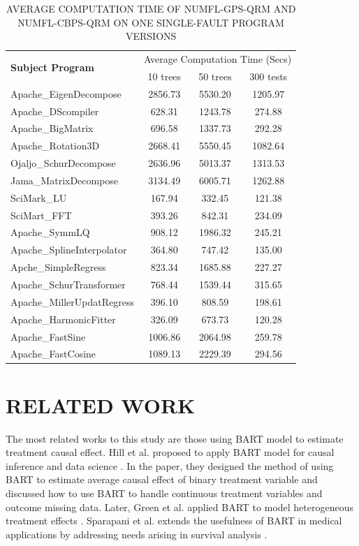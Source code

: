 \begin{table}[htbp!]
\caption{AVERAGE COMPUTATION TIME OF NUMFL-GPS-QRM AND NUMFL-CBPS-QRM ON ONE SINGLE-FAULT PROGRAM VERSIONS }
\label{BARTcomputetime}
\centering
      \begin{tabular}{|l|c|c|c|}
      \hline
\multirow{2}{*}{{\bf Subject Program}}	&	\multicolumn{3}{|c|}{Average Computation Time (Secs)}	\\	\cline{2-4}
& 10 trees & 50 trees & 300 tests\\ \hline

Apache\_EigenDecompose	&	2856.73	&	5530.20	&	1205.97	\\ \hline
Apache\_DScompiler	&	628.31	&	1243.78	&	274.88	\\ \hline
Apache\_BigMatrix	&	696.58	&	1337.73	&	292.28	\\ \hline
Apache\_Rotation3D	&	2668.41	&	5550.45	&	1082.64	\\ \hline
Ojaljo\_SchurDecompose	&	2636.96	&	5013.37	&	1313.53	\\ \hline
Jama\_MatrixDecompose	&	3134.49	&	6005.71	&	1262.88	\\ \hline
SciMark\_LU	&	167.94	&	332.45	&	121.38	\\ \hline
SciMart\_FFT	&	393.26	&	842.31	&	234.09	\\ \hline
Apache\_SymmLQ	&	908.12	&	1986.32	&	245.21	\\ \hline
Apache\_SplineInterpolator	&	364.80	&	747.42	&	135.00	\\ \hline
Apche\_SimpleRegress	&	823.34	&	1685.88	&	227.27	\\ \hline
Apache\_SchurTransformer	&	768.44	&	1539.44	&	315.65	\\ \hline
Apache\_MillerUpdatRegress	&	396.10	&	808.59	&	198.61	\\ \hline
Apache\_HarmonicFitter	&	326.09	&	673.73	&	120.28	\\ \hline
Apache\_FastSine	&	1006.86	&	2064.98	&	259.78	\\ \hline
Apache\_FastCosine	&	1089.13	&	2229.39	&	294.56	\\ \hline
\end{tabular}
\end{table}

\section{RELATED WORK}\label{BARTrelatedwork}
The most related works to this study are those using BART model to estimate treatment causal effect. Hill et al. proposed to apply BART model for causal inference and data science \cite{hill2012bayesian, hill2013assessing}. In the paper, they designed the method of using BART to estimate average causal effect of binary treatment variable and discussed how to use BART to handle continuous treatment variables and outcome missing data. Later, Green et al. applied BART to model heterogeneous treatment effects \cite{green2012modeling}. Sparapani et al. extends the usefulness of BART in medical applications by addressing needs arising in survival analysis \cite{sparapani2016nonparametric}.

